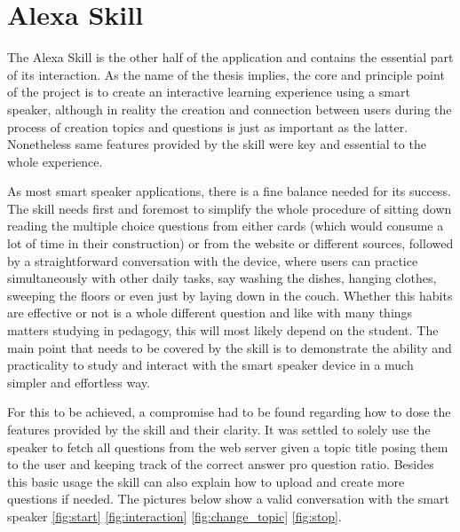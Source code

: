 \section{Alexa Skill}

The Alexa Skill is the other half of the application and contains the essential
part of its interaction.
As the name of the thesis implies, the core and principle point of 
the project is to create an interactive learning experience using a smart speaker,
although in reality the creation and connection between users during the process
of creation topics and questions is just as important as the latter. Nonetheless
same features provided by the skill were key and essential to the whole experience.

As most smart speaker applications, there is a fine balance needed for its success.
The skill needs first and foremost to simplify the whole procedure of sitting down 
reading the multiple choice questions from either cards (which would consume a lot 
of time in their construction) or from the website or different sources, followed
by a straightforward conversation with the device, where users can practice 
simultaneously with other daily tasks, say washing the dishes, hanging clothes,
sweeping the floors or even just by laying down in the couch. Whether this habits
are effective or not is a whole different question and like with many things matters
studying in pedagogy, this will most likely depend on the student. The main point
that needs to be covered by the skill is to demonstrate the ability and 
practicality to study and interact with the smart speaker device in a much 
simpler and effortless way.

For this to be achieved, a compromise had to be found regarding how to dose the 
features provided by the skill and their clarity. It was settled to solely use 
the speaker to fetch all questions from the web server given a topic title posing
them to the user and keeping track of the correct answer pro question ratio.
Besides this basic usage the skill can also explain how to upload and create more
questions if needed. The pictures below show a valid conversation with the smart
speaker \ref{fig:start} \ref{fig:interaction} \ref{fig:change_topic} \ref{fig:stop}.


